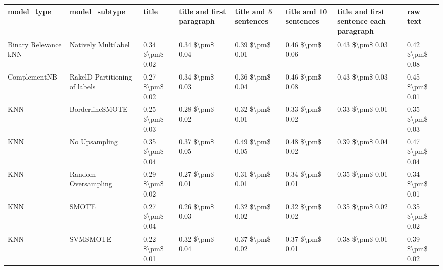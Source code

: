 \begin{tabular}{llllllll}
\toprule
                     model\_type &                 model\_subtype &           title & title and first paragraph & title and 5 sentences & title and 10 sentences & title and first sentence each paragraph &            raw text \\
\midrule
           Binary Relevance kNN &           Natively Multilabel & 0.34 \$\textbackslash pm\$ 0.02 &           0.34 \$\textbackslash pm\$ 0.04 &       0.39 \$\textbackslash pm\$ 0.01 &        0.46 \$\textbackslash pm\$ 0.06 &                         0.43 \$\textbackslash pm\$ 0.03 &     0.42 \$\textbackslash pm\$ 0.08 \\
                   ComplementNB & RakelD Partitioning of labels & 0.27 \$\textbackslash pm\$ 0.02 &           0.34 \$\textbackslash pm\$ 0.03 &       0.36 \$\textbackslash pm\$ 0.04 &        0.46 \$\textbackslash pm\$ 0.08 &                         0.43 \$\textbackslash pm\$ 0.03 &     0.45 \$\textbackslash pm\$ 0.01 \\
                            KNN &               BorderlineSMOTE & 0.25 \$\textbackslash pm\$ 0.03 &           0.28 \$\textbackslash pm\$ 0.02 &       0.32 \$\textbackslash pm\$ 0.01 &        0.33 \$\textbackslash pm\$ 0.02 &                         0.33 \$\textbackslash pm\$ 0.01 &     0.35 \$\textbackslash pm\$ 0.03 \\
                            KNN &                 No Upsampling & 0.35 \$\textbackslash pm\$ 0.04 &           0.37 \$\textbackslash pm\$ 0.05 &       0.49 \$\textbackslash pm\$ 0.05 &        0.48 \$\textbackslash pm\$ 0.02 &                         0.39 \$\textbackslash pm\$ 0.04 &     0.47 \$\textbackslash pm\$ 0.04 \\
                            KNN &           Random Oversampling & 0.29 \$\textbackslash pm\$ 0.02 &           0.27 \$\textbackslash pm\$ 0.01 &       0.31 \$\textbackslash pm\$ 0.01 &        0.34 \$\textbackslash pm\$ 0.01 &                         0.35 \$\textbackslash pm\$ 0.01 &     0.34 \$\textbackslash pm\$ 0.01 \\
                            KNN &                         SMOTE & 0.27 \$\textbackslash pm\$ 0.04 &           0.26 \$\textbackslash pm\$ 0.03 &       0.32 \$\textbackslash pm\$ 0.02 &        0.32 \$\textbackslash pm\$ 0.02 &                         0.35 \$\textbackslash pm\$ 0.02 &     0.35 \$\textbackslash pm\$ 0.02 \\
                            KNN &                      SVMSMOTE & 0.22 \$\textbackslash pm\$ 0.01 &           0.32 \$\textbackslash pm\$ 0.04 &       0.37 \$\textbackslash pm\$ 0.02 &        0.37 \$\textbackslash pm\$ 0.01 &                         0.38 \$\textbackslash pm\$ 0.01 &     0.39 \$\textbackslash pm\$ 0.02 \\

\end{tabular}
